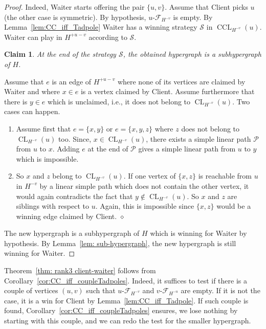 \documentclass{article}
\newcommand{\strat}{\mathcal{S}}
\newcommand{\hedge}{edge\xspace}
\DeclareMathOperator{\CL}{CL}
\DeclareMathOperator{\CCL}{CCL}
\newcommand{\uCwin}{u\text{-}\mathcal{F}}
\newcommand{\vCwin}{v\text{-}\mathcal{F}}
\newtheorem{claim}[theorem]{Claim}
\newcommand{\qedclaim}{\hfill $\diamond$ \medskip}
\newenvironment{proofclaimitem}{\noindent{\em Proof of the claim.}}{}
\begin{document}
\begin{proof}
	Indeed, Waiter starts offering the pair \(\{u,v\}\). Assume that Client picks \(u\) (the other case is symmetric). By hypothesis, \(\uCwin_{H^{-v}}\) is empty. By Lemma~\ref{lem:CC_iff_Tadpole} Waiter has a winning strategy \(\strat\) in \(\CCL_{H^{-v}}(u)\). Waiter can play in \(H^{+u-v}\) according to \(\strat\).
\begin{claim}
		At the end of the strategy \(\strat\), the obtained hypergraph is a subhypergraph of \(H\).
\end{claim}
	\begin{proofclaimitem}
		Assume that \(e\) is an \hedge of \(H^{+u-v}\) where none of its vertices are claimed by Waiter and where \(x \in e\) is a vertex claimed by Client. 
		Assume furthermore that there is \(y \in e\) which is unclaimed, i.e., it does not belong to \(\CL_{H^{-v}}(u)\).
Two cases can happen.
		\begin{enumerate}
			\item Assume  first that \(e = \{x,y\}\) or \(e = \{x,y,z\}\) where \(z\) does not belong to \(\CL_{H^{-v}}(u)\) too. Since, \(x \in \CL_{H^{-v}}(u)\), there exists a simple linear path \(\mathcal{P}\) from \(u\) to \(x\). Adding \(e\) at the end of \(\mathcal{P}\) gives a simple linear path from \(u\) to \(y\) which is impossible.
			\item So \(x\) and \(z\) belong to \(\CL_{H^{-v}}(u)\). If one vertex of \(\{x,z\}\) is reachable from \(u\) in \(H^{-v}\) by a linear simple path which does not contain the other vertex, it would again contradicts the fact that \(y \notin \CL_{H^{-v}}(u)\). So \(x\) and \(z\) are siblings with respect to \(u\). Again, this is impossible since \(\{x,z\}\) would be a winning \hedge claimed by Client. \qedclaim
		\end{enumerate}
	\end{proofclaimitem}
The new hypergraph is a subhypergraph of \(H\) which is winning for Waiter by hypothesis. By Lemma~\ref{lem: sub-hypergraph}, the new hypergraph is still winning for Waiter.
\end{proof}

Theorem~\ref{thm: rank3 client-waiter} follows from Corollary~\ref{cor:CC_iff_coupleTadpoles}. Indeed, it suffices to test if there is a couple of vertices \((u,v)\) such that \(\uCwin_{H^{-v}}\) and \(\vCwin_{H^{-u}}\) are empty. If it is not the case, it is a win for Client by Lemma~\ref{lem:CC_iff_Tadpole}. If such couple is found, Corollary~\ref{cor:CC_iff_coupleTadpoles} ensures, we lose nothing by starting with this couple, and we can redo the test for the smaller hypergraph.
\end{document}
